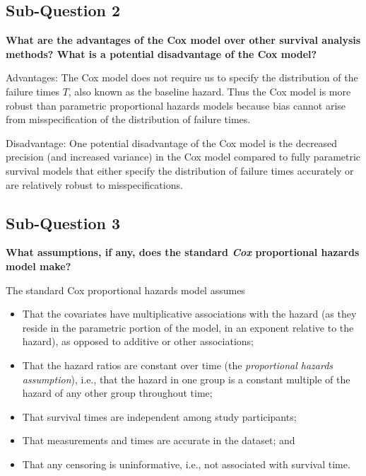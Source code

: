 \documentclass{article}\usepackage[]{graphicx}\usepackage[]{color}
\begin{document}
\subsection*{Sub-Question 2}
\textbf{What are the advantages of the Cox model over other survival analysis methods? What is a potential disadvantage of the Cox model?}

\vspace{2mm}

Advantages:
The Cox model does not require us to specify the distribution of the failure times $T$, also known as the baseline hazard.  Thus the Cox model is more robust than parametric proportional hazards models because bias cannot arise from misspecification of the distribution of failure times.

Disadvantage:
One potential disadvantage of the Cox model is the decreased precision (and increased variance) in the Cox model compared to fully parametric survival models that either specify the distribution of failure times accurately or are relatively robust to misspecifications.

\vspace{2mm}

\subsection*{Sub-Question 3}
\textbf{What assumptions, if any, does the standard \textit{Cox} proportional hazards model make?}

\vspace{2mm}

The standard Cox proportional hazards model assumes

\begin{itemize}
  \item That the covariates have multiplicative associations with the hazard (as they reside in the parametric portion of the model, in an exponent relative to the hazard), as opposed to additive or other associations;
  \item That the hazard ratios are constant over time (the \textit{proportional hazards assumption}), i.e., that the hazard in one group is a constant multiple of the hazard of any other group throughout time;
  \item That survival times are independent among study participants; 
  \item That measurements and times are accurate in the dataset; and
  \item That any censoring is uninformative, i.e., not associated with survival time.
  
\end{itemize}
\end{document}
